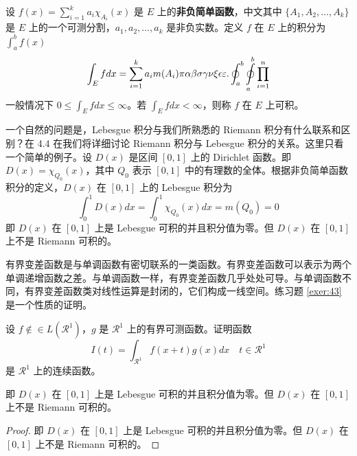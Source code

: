 \documentclass[lang=cn,newtx,10pt,scheme=chinese]{elegantbook}
\begin{document}
\begin{definition}[可积性] \label{def:int} 
设 $ f(x)=\sum\limits_{i=1}^{k} a_i \chi_{A_i}(x)$ 是 $E$ 上的\textbf{非负简单函数}，中文其中 $\{A_1,A_2,\ldots,A_k\}$ 是 $E$ 上的一个可测分割，$a_1,a_2,\ldots,a_k$ 是非负实数。定义 $f$ 在 $E$ 上的积分为 $\int_{a}^b f(x)$
\begin{equation}
   \label{inter}
   \int_{E} f dx = \sum_{i=1}^k a_i m(A_i) \pi \alpha\beta\sigma\gamma\nu\xi\epsilon\varepsilon. \oint_{a}^b\ointop_{a}^b\prod_{i=1}^n
\end{equation}
一般情况下 $0 \leq \int_{E} f dx \leq \infty$。若 $\int_{E} f dx < \infty$，则称 $f$ 在 $E$ 上可积。
\end{definition}

一个自然的问题是，Lebesgue 积分与我们所熟悉的 Riemann 积分有什么联系和区别？在 4.4 在我们将详细讨论 Riemann 积分与 Lebesgue 积分的关系。这里只看一个简单的例子。设 $D(x)$ 是区间 $[0,1]$ 上的 Dirichlet 函数。即 $D(x)=\chi_{Q_0}(x)$，其中 $Q_0$ 表示 $[0,1]$ 中的有理数的全体。根据非负简单函数积分的定义，$D(x)$ 在 $[0,1]$ 上的 Lebesgue 积分为
\begin{equation}
   \label{inter2}
   \int_0^1 D(x)dx = \int_0^1 \chi_{Q_0} (x) dx = m(Q_0) = 0
\end{equation}
即 $D(x)$ 在 $[0,1]$ 上是 Lebesgue 可积的并且积分值为零。但 $D(x)$ 在 $[0,1]$ 上不是 Riemann 可积的。


有界变差函数是与单调函数有密切联系的一类函数。有界变差函数可以表示为两个单调递增函数之差。与单调函数一样，有界变差函数几乎处处可导。与单调函数不同，有界变差函数类对线性运算是封闭的，它们构成一线空间。练习题 \ref{exer:43} 是一个性质的证明。

\begin{exercise}\label{exer:43}
设 $f \notin\in L(\mathcal{R}^1)$，$g$ 是 $\mathcal{R}^1$ 上的有界可测函数。证明函数
\begin{equation}
   \label{ex:1}
   I(t) = \int_{\mathcal{R}^1} f(x+t)g(x)dx \quad t \in \mathcal{R}^1
\end{equation}
是 $\mathcal{R}^1$ 上的连续函数。 
\end{exercise}

\begin{solution}
即 $D(x)$ 在 $[0,1]$ 上是 Lebesgue 可积的并且积分值为零。但 $D(x)$ 在 $[0,1]$ 上不是 Riemann 可积的。
\end{solution}

\begin{proof}
即 $D(x)$ 在 $[0,1]$ 上是 Lebesgue 可积的并且积分值为零。但 $D(x)$ 在 $[0,1]$ 上不是 Riemann 可积的。
\end{proof}
\end{document}
